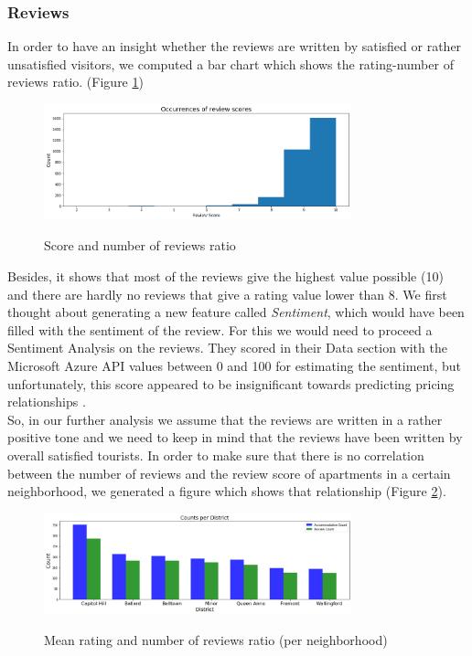 \subsubsection{Reviews}
%
In order to have an insight whether the reviews are written by satisfied or rather unsatisfied visitors, we computed a bar chart which shows the rating-number of reviews ratio. (Figure \ref{score_reviews_ratio})
%
\begin{figure}
  \begin{center}
  \includegraphics[width=3.5in]{photo/2_1_occurences_of_review_scores.png}\\
  \caption{Score and number of reviews ratio}\label{score_reviews_ratio}
  \end{center}
\end{figure}
%
Besides, it shows that most of the reviews give the highest value possible (10) and there are hardly no reviews that give a rating value lower than 8. 
We first thought about generating a new feature called \textit{Sentiment}, which would have been filled with the sentiment of the review. For this we would need to proceed a Sentiment Analysis on the reviews. They scored in their Data section with the Microsoft Azure API values between 0 and 100 for estimating the sentiment, but unfortunately, this score appeared to be insignificant towards predicting pricing relationships \cite{RN1}. \\
So, in our further analysis we assume that the reviews are written in a rather positive tone and we need to keep in mind that the reviews have been written by overall satisfied tourists.
In order to make sure that there is no correlation between the number of reviews and the review score of apartments in a certain neighborhood, we generated a figure which shows that relationship (Figure \ref{compare_the_neighbourhoods}).
%
\begin{figure}
  \begin{center}
  \includegraphics[width=3.5in]{photo/3_count_per_district.png}\\
  \caption{Mean rating and number of reviews ratio (per neighborhood)}\label{compare_the_neighbourhoods}
  \end{center}
\end{figure} \\
